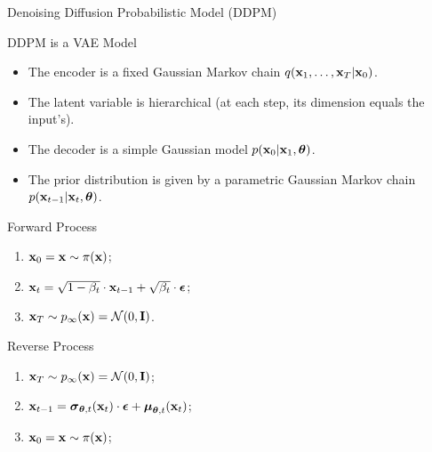 \documentclass{beamer}
\begin{document}
\begin{frame}{Denoising Diffusion Probabilistic Model (DDPM)}
    \begin{block}{DDPM is a VAE Model}
        \begin{itemize}
            \item The encoder is a fixed Gaussian Markov chain $q(\mathbf{x}_1, \dots, \mathbf{x}_T | \mathbf{x}_0)$.
            \item The latent variable is hierarchical (at each step, its dimension equals the input's).
            \item The decoder is a simple Gaussian model $p(\mathbf{x}_0 | \mathbf{x}_1, \boldsymbol{\theta})$.
            \item The prior distribution is given by a parametric Gaussian Markov chain $p(\mathbf{x}_{t-1} | \mathbf{x}_t, \boldsymbol{\theta})$.
        \end{itemize}
    \end{block}
    \begin{minipage}{0.5\linewidth}
        \begin{block}{Forward Process}
            \begin{enumerate}
                \item $\mathbf{x}_0 = \mathbf{x} \sim \pi(\mathbf{x})$;
                \item $\mathbf{x}_t = \sqrt{1 - \beta_t} \cdot \mathbf{x}_{t - 1} + \sqrt{\beta_t} \cdot \boldsymbol{\epsilon}$;
                \item $\mathbf{x}_T \sim p_{\infty}(\mathbf{x}) = \mathcal{N}(0, \mathbf{I})$.
            \end{enumerate}
        \end{block}
    \end{minipage}%
    \begin{minipage}{0.55\linewidth}
        \begin{block}{Reverse Process}
            \begin{enumerate}
                \item $\mathbf{x}_T \sim p_{\infty}(\mathbf{x}) = \mathcal{N}(0, \mathbf{I})$;
                \item $\mathbf{x}_{t - 1} = \boldsymbol{\sigma}_{\boldsymbol{\theta}, t}(\mathbf{x}_t) \cdot \boldsymbol{\epsilon} + \boldsymbol{\mu}_{\boldsymbol{\theta}, t}(\mathbf{x}_t)$;
                \item $\mathbf{x}_0 = \mathbf{x} \sim \pi(\mathbf{x})$;
            \end{enumerate}
        \end{block}
    \end{minipage}
\end{frame}
\end{document}

